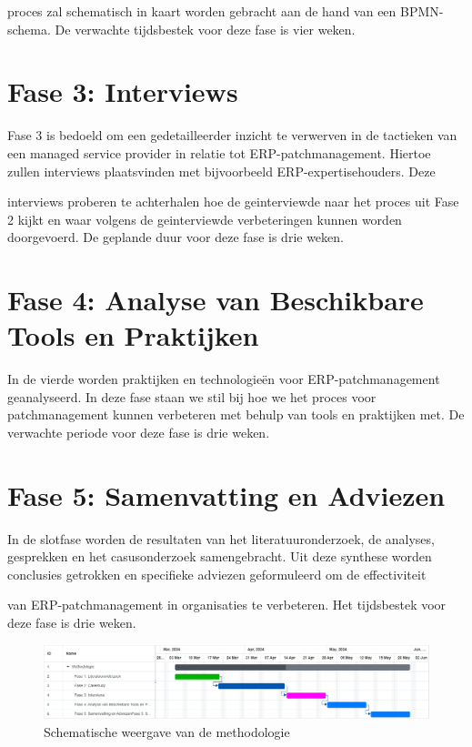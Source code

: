 proces zal schematisch in kaart worden gebracht aan de hand van een BPMN-schema. De verwachte tijdsbestek voor deze fase is vier weken.
\section{Fase 3: Interviews}
Fase 3 is bedoeld om een gedetailleerder inzicht te verwerven in de tactieken van een managed service provider in relatie tot ERP-patchmanagement. Hiertoe zullen interviews plaatsvinden met bijvoorbeeld ERP-expertisehouders. Deze 

interviews proberen te achterhalen hoe de geinterviewde naar het proces uit Fase 2 kijkt en waar volgens de geinterviewde verbeteringen kunnen worden doorgevoerd. De geplande duur voor deze fase is drie weken.
\section{Fase 4: Analyse van Beschikbare Tools en Praktijken}
In de vierde worden praktijken en technologieën voor ERP-patchmanagement geanalyseerd. In deze fase staan we stil bij hoe we het proces voor patchmanagement kunnen verbeteren met behulp van tools en praktijken met. De verwachte periode voor deze fase is drie weken.
\section{Fase 5: Samenvatting en Adviezen}
In de slotfase worden de resultaten van het literatuuronderzoek, de analyses, gesprekken en het casusonderzoek samengebracht. Uit deze synthese worden conclusies getrokken en specifieke adviezen geformuleerd om de effectiviteit 

van ERP-patchmanagement in organisaties te verbeteren. Het tijdsbestek voor deze fase is drie weken. \\

\begin{figure}[h]
    \centering
    \includegraphics[width=\textwidth]{methodologie2.png}
    \caption{Schematische weergave van de methodologie}
     \label{fig:methodologie2}
\end{figure}
\newpage
